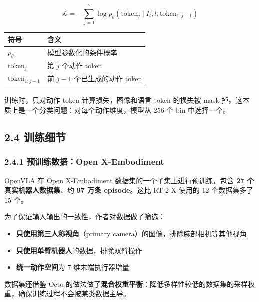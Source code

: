 \documentclass[
  chinese,
]{ctexart}
\providecommand{\tightlist}{%
  \setlength{\itemsep}{0pt}\setlength{\parskip}{0pt}}
\begin{document}
\[
\mathcal{L} = -\sum_{j=1}^{7} \log p_\theta(\text{token}_j \mid I_t, l, \text{token}_{1:j-1})
\]

\begin{center}
\begin{tabular}{@{}>{\raggedright\arraybackslash}p{} >{\raggedright\arraybackslash}p{}@{}}
\toprule\noalign{}
符号 & 含义 \\
\midrule\noalign{}
\(p_\theta\) & 模型参数化的条件概率 \\
\(\text{token}_j\) & 第 \(j\) 个动作 token \\
\(\text{token}_{1:j-1}\) & 前 \(j-1\) 个已生成的动作 token \\
\bottomrule\noalign{}
\end{tabular}
\end{center}

训练时，只对动作 token 计算损失，图像和语言 token 的损失被 mask
掉。这本质上是一个分类问题：对每个动作维度，模型从 256 个 bin
中选择一个。

\subsection{2.4 训练细节}\label{ux8badux7ec3ux7ec6ux8282}

\subsubsection{2.4.1 预训练数据：Open
X-Embodiment}\label{ux9884ux8badux7ec3ux6570ux636eopen-x-embodiment}

OpenVLA 在 Open X-Embodiment 数据集的一个子集上进行预训练，包含
\textbf{27 个真实机器人数据集}、约 \textbf{97 万条 episode}。这比 RT-2-X
使用的 12 个数据集多了 15 个。

为了保证输入输出的一致性，作者对数据做了筛选：

\begin{itemize}
\tightlist
\item
  \textbf{只使用第三人称视角}（primary
  camera）的图像，排除腕部相机等其他视角
\item
  \textbf{只使用单臂机器人}的数据，排除双臂操作
\item
  \textbf{统一动作空间}为 7 维末端执行器增量
\end{itemize}

数据集还借鉴 Octo
的做法做了\textbf{混合权重平衡}：降低多样性较低的数据集的采样权重，确保训练过程不会被某类数据主导。
\end{document}
